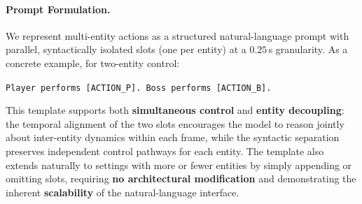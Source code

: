 \paragraph{Prompt Formulation. }
We represent multi-entity actions as a structured natural-language prompt with parallel, 
syntactically isolated slots (one per entity) at a $0.25$\,s granularity. As a concrete example, for two-entity control:
\begin{center}
  \small\texttt{Player performs [ACTION\_P]. Boss performs [ACTION\_B].}
\end{center}
This template supports both \textbf{simultaneous control} and 
\textbf{entity decoupling}: the temporal alignment of the two slots encourages the 
model to reason jointly about inter-entity dynamics within each frame, while the 
syntactic separation preserves independent control pathways for each entity. 
The template also extends naturally to settings with more or fewer entities 
by simply appending or omitting slots, requiring \textbf{no architectural modification}
and demonstrating the inherent \textbf{scalability} of the natural-language interface.


